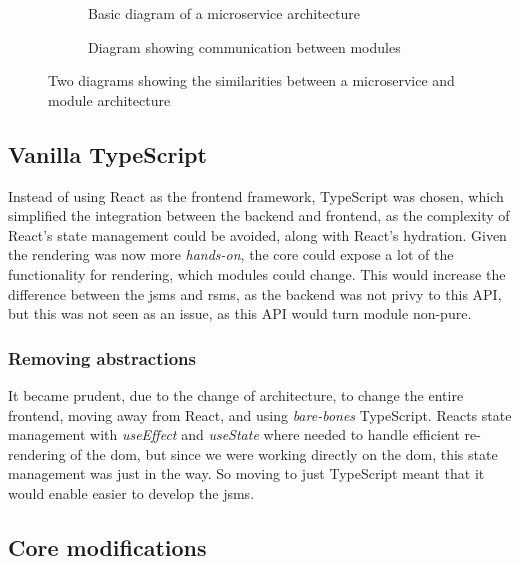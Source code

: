 \begin{figure}[H]
  \begin{subfigure}[h]{0.49\linewidth}
    
    \caption{Basic diagram of a microservice architecture}
    \label{sfig:mic}
  \end{subfigure}
  \hfill
  \begin{subfigure}[h]{0.49\linewidth}
    
    \caption{Diagram showing communication between modules}
    \label{sfig:mod}
  \end{subfigure}
  \caption{
    Two diagrams showing the similarities between a microservice and module
    architecture
  }
  \label{fig:comp}
\end{figure}


\subsection{Vanilla TypeScript}

Instead of using React as the frontend framework, TypeScript was chosen, which
simplified the integration between the backend and frontend, as the complexity
of React's state management could be avoided, along with React's hydration.
Given the rendering was now more \textit{hands-on}, the core could expose a lot
of the functionality for rendering, which modules could change. This would
increase the difference between the \gls*{jsms} and \gls*{rsms}, as the backend
was not privy to this API, but this was not seen as an issue, as this API would
turn module non-pure.

\subsubsection{Removing abstractions}

It became prudent, due to the change of architecture, to change the entire
frontend, moving away from React, and using \textit{bare-bones} TypeScript.
Reacts state management with \textit{useEffect} and \textit{useState} where
needed to handle efficient re-rendering of the \gls{dom}, but since we were
working directly on the \gls{dom}, this state management was just in the way. So
moving to just TypeScript meant that it would enable easier to develop the
\gls*{jsms}.

\subsection{Core modifications}

